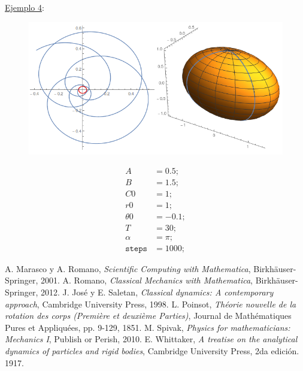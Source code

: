 \documentclass[a4paper,10pt]{article}
\numberwithin{equation}{section}
\begin{document}
\vspace{1cm}

\underline{Ejemplo 4}:

\begin{multicols}{2}

\begin{figure}[H]
\center
\includegraphics[scale=0.35]{problema5fig5}
\label{fig:problema5fig5}
\end{figure}

\begin{align*}
 A &= 0.5; \\
 B &= 1.5; \\
 C0 &= 1; \\ 
 r0 &= 1; \\
 \theta 0 &= -0.1; \\
 T &= 30; \\
 \alpha &= \pi; \\ 
 \texttt{steps} &= 1000;
\end{align*}

\end{multicols}


\begin{thebibliography}{10}
 A. Marasco y A. Romano, \emph{Scientific Computing with Mathematica\textregistered}, Birkhäuser-Springer,
 2001.
 A. Romano, \emph{Classical Mechanics with Mathematica\textregistered}, Birkhäuser-Springer, 
 2012.
 J. José y E. Saletan, \emph{Classical dynamics: A contemporary approach}, Cambridge University Press,
 1998.
 L. Poinsot, \emph{Théorie nouvelle de la rotation des corps (Première et deuxième Parties)}, 
 Journal de Mathématiques Pures et Appliquées, pp. 9-129, 1851.
 M. Spivak, \emph{Physics for mathematicians: Mechanics I}, Publish or Perish,
 2010.
 E. Whittaker, \emph{A treatise on the analytical dynamics of particles 
 and rigid bodies}, Cambridge University Press, 2da edición. 1917.
\end{thebibliography}
\end{document}
